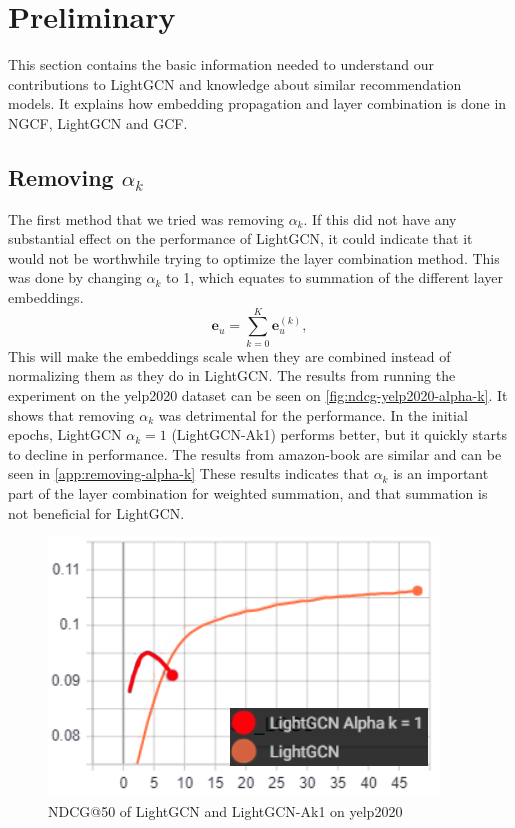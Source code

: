 \section{Preliminary}
This section contains the basic information needed to understand our contributions to LightGCN and knowledge about similar recommendation models.
It explains how embedding propagation and layer combination is done in NGCF, LightGCN and GCF.


\subsection{Removing $\alpha_k$}
The first method that we tried was removing $\alpha_k$.
If this did not have any substantial effect on the performance of LightGCN, it could indicate that it would not be worthwhile trying to optimize the layer combination method.
This was done by changing $\alpha_k$ to 1, which equates to summation of the different layer embeddings.
\begin{equation}
    \mathbf{e}_u = \sum_{k=0}^{K} \mathbf{e}_u^{(k)},
    \label{eq:removing-alpha-k-lightgcn-sum}
\end{equation}
This will make the embeddings scale when they are combined instead of normalizing them as they do in LightGCN.
The results from running the experiment on the yelp2020 dataset can be seen on \autoref{fig:ndcg-yelp2020-alpha-k}.
It shows that removing $\alpha_k$ was detrimental for the performance.
In the initial epochs, LightGCN $\alpha_k = 1$ (LightGCN-Ak1) performs better, but it quickly starts to decline in performance.
The results from amazon-book are similar and can be seen in \autoref{app:removing-alpha-k}
These results indicates that $\alpha_k$ is an important part of the layer combination for weighted summation, and that summation is not beneficial for LightGCN.
\begin{figure}
    \includegraphics[width=\linewidth]{figures/alpha-k-results/yelp2020-ndcg.png}
    \caption{NDCG@50 of LightGCN and LightGCN-Ak1 on yelp2020}
    \label{fig:ndcg-yelp2020-alpha-k}
\end{figure}
